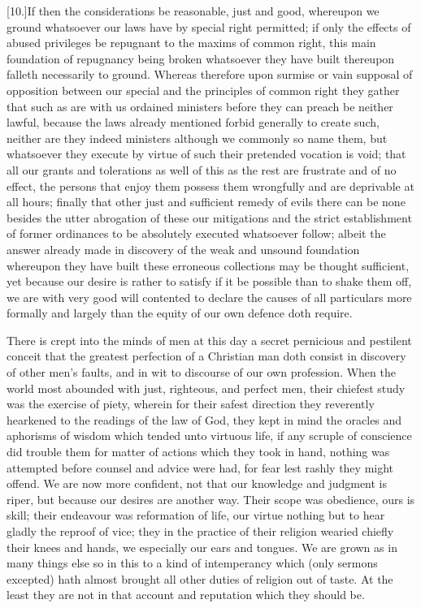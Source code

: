 [10.]If then the considerations be reasonable, just and good, whereupon we ground whatsoever our laws have by special right permitted; if only the effects of abused privileges be repugnant to the maxims of common right, this main foundation of repugnancy being broken whatsoever they have built thereupon falleth necessarily to ground. Whereas therefore upon surmise or vain supposal of opposition between our special and the principles of common right they gather that such as are with us ordained ministers before they can preach be neither lawful, because the laws already mentioned forbid generally to create such, neither are they indeed ministers although we commonly so name them, but whatsoever they execute by virtue of such their pretended vocation is void; that all our grants and tolerations as well of this as the rest are frustrate and of no effect, the persons that enjoy them possess them wrongfully and are deprivable at all hours; finally that other just and sufficient remedy of evils there can be none besides the utter abrogation of these our mitigations and the strict establishment of former ordinances to be absolutely executed whatsoever follow; albeit the answer already made in  discovery of the weak and unsound foundation whereupon they have built these erroneous collections may be thought sufficient,
 yet because our desire is rather to satisfy if it be possible than to shake them off, we are with very good will contented to declare the causes of all particulars more formally and largely than the equity of our own defence doth require.

There is crept into the minds of men at this day a secret pernicious and pestilent conceit that the greatest perfection of a Christian man doth consist in discovery of other men’s faults, and in wit to discourse of our own profession. When the world most abounded with just, righteous, and perfect men, their chiefest study was the exercise of piety, wherein for their safest direction they reverently hearkened to the readings of the law of God, they kept in mind the oracles and aphorisms of wisdom which tended unto virtuous life, if any scruple of conscience did trouble them for matter of actions which they took in hand, nothing was attempted before counsel and advice were had, for fear lest rashly they might offend. We are now more confident, not that our knowledge and judgment is riper, but because our desires are another way. Their scope was obedience, ours is skill; their endeavour was reformation of life, our virtue nothing but to hear gladly the reproof of vice; they in the practice of their religion wearied chiefly their knees and hands, we especially our ears and tongues. We are grown as in many things else so in this to a kind of intemperancy which (only sermons excepted) hath almost brought all other duties of religion out of taste. At the least they are not in that account and reputation which they should be.

